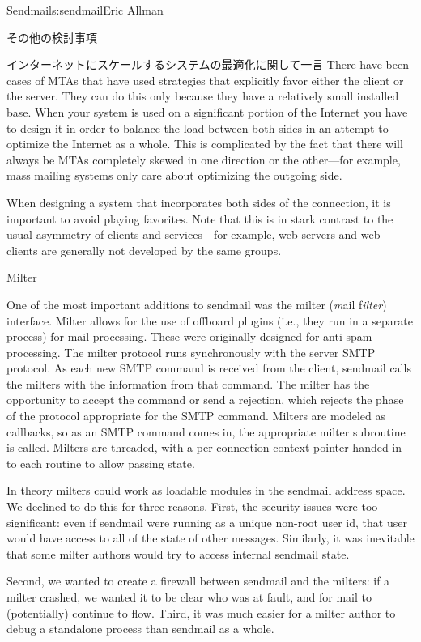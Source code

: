 \begin{aosachapter}{Sendmail}{s:sendmail}{Eric Allman}
\begin{aosasect1}{その他の検討事項}
\begin{aosasect2}{インターネットにスケールするシステムの最適化に関して一言}
There have been cases of MTAs that have used strategies that
explicitly favor either the client or the server. They can do this
only because they have a relatively small installed base.  When your
system is used on a significant portion of the Internet you have to
design it in order to balance the load between both sides in an
attempt to optimize the Internet as a whole. This is complicated by
the fact that there will always be MTAs completely skewed in one
direction or the other---for example, mass mailing systems only care
about optimizing the outgoing side.

When designing a system that incorporates both sides of the
connection, it is important to avoid playing favorites. Note that this
is in stark contrast to the usual asymmetry of clients and
services---for example, web servers and web clients are generally not
developed by the same groups.

\end{aosasect2}

\begin{aosasect2}{Milter}

One of the most important additions to sendmail was the milter
(\emph{m}ail f\emph{ilter}) interface.  Milter allows for the use of
offboard plugins (i.e., they run in a separate process) for mail
processing. These were originally designed for anti-spam
processing. The milter protocol runs synchronously with the server
SMTP protocol. As each new SMTP command is received from the client,
sendmail calls the milters with the information from that command. The
milter has the opportunity to accept the command or send a rejection,
which rejects the phase of the protocol appropriate for the SMTP
command. Milters are modeled as callbacks, so as an SMTP command comes
in, the appropriate milter subroutine is called. Milters are threaded,
with a per-connection context pointer handed in to each routine to
allow passing state.

In theory milters could work as loadable modules in the sendmail
address space. We declined to do this for three reasons.  First, the
security issues were too significant: even if sendmail were running as
a unique non-root user id, that user would have access to all of the
state of other messages.  Similarly, it was inevitable that some milter
authors would try to access internal sendmail state.

Second, we wanted to create a firewall between sendmail and the
milters: if a milter crashed, we wanted it to be clear who was at
fault, and for mail to (potentially) continue to flow. Third, it was
much easier for a milter author to debug a standalone process than
sendmail as a whole.


\end{aosasect2}
\end{aosasect1}
\end{aosachapter}
